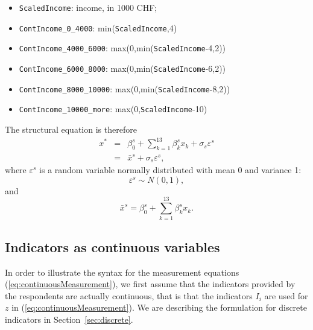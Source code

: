 \documentclass[12pt,a4paper]{article}
\newcommand{\req}[1]{(\ref{#1})}
\begin{document}
\begin{itemize}
\item \lstinline+ScaledIncome+: income, in 1000 CHF;
\item \lstinline+ContIncome_0_4000+:  min(\lstinline+ScaledIncome+,4)
\item \lstinline+ContIncome_4000_6000+: max(0,min(\lstinline+ScaledIncome+-4,2))
\item \lstinline+ContIncome_6000_8000+: max(0,min(\lstinline+ScaledIncome+-6,2))
\item \lstinline+ContIncome_8000_10000+: max(0,min(\lstinline+ScaledIncome+-8,2))
\item \lstinline+ContIncome_10000_more+: max(0,\lstinline+ScaledIncome+-10)
\end{itemize}

The structural equation is therefore
\begin{equation}
\label{eq:x_s}
\begin{array}{rcl}
x^* &=& \beta^s_0 + \sum_{k=1}^{13} \beta^s_k x_k + \sigma_s
\varepsilon^s \\
 &=& \bar{x}^s + \sigma_s \varepsilon^s,
\end{array}
\end{equation}
where $\varepsilon^s$ is a random variable normally distributed with
mean 0 and variance 1: 
\begin{equation}
\varepsilon^s \sim N(0,1),
\end{equation}
and
\begin{equation}
\bar{x}^s = \beta^s_0 + \sum_{k=1}^{13} \beta^s_k x_k.
\end{equation}
\subsection{Indicators as continuous variables}
\label{sec:continuous}
In order to illustrate the syntax for the measurement equations
\req{eq:continuousMeasurement}, we first 
assume that the indicators provided by the respondents are
actually continuous, that is that the indicators $I_i$ are used for $z$ in \req{eq:continuousMeasurement}.  We are describing the
formulation for discrete indicators in Section~\ref{sec:discrete}. 
\end{document}
